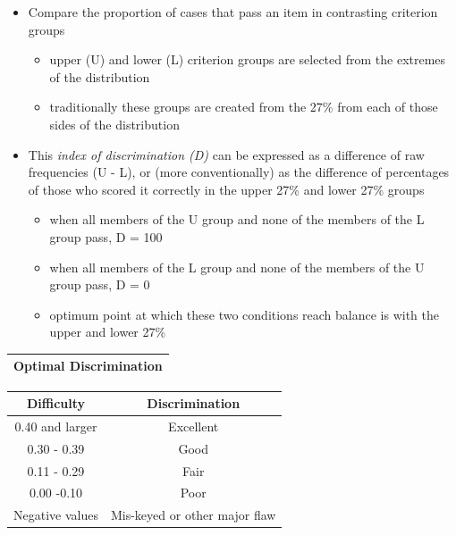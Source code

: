 \documentclass[
  english,
]{book}
\providecommand{\tightlist}{%
  \setlength{\itemsep}{0pt}\setlength{\parskip}{0pt}}
\begin{document}
\begin{itemize}
\tightlist
\item
  Compare the proportion of cases that pass an item in contrasting criterion groups

  \begin{itemize}
  \tightlist
  \item
    upper (U) and lower (L) criterion groups are selected from the extremes of the distribution
  \item
    traditionally these groups are created from the 27\% from each of those sides of the distribution
  \end{itemize}
\item
  This \emph{index of discrimination (D)} can be expressed as a difference of raw frequencies (U - L), or (more conventionally) as the difference of percentages of those who scored it correctly in the upper 27\% and lower 27\% groups

  \begin{itemize}
  \tightlist
  \item
    when all members of the U group and none of the members of the L group pass, D = 100
  \item
    when all members of the L group and none of the members of the U group pass, D = 0
  \item
    optimum point at which these two conditions reach balance is with the upper and lower 27\%
  \end{itemize}
\end{itemize}

\begin{longtable}[]{@{}l@{}}
\toprule
Optimal Discrimination \\
\midrule
\endhead
\bottomrule
\end{longtable}

\begin{longtable}[]{@{}cc@{}}
\toprule
Difficulty & Discrimination \\
\midrule
\endhead
0.40 and larger & Excellent \\
0.30 - 0.39 & Good \\
0.11 - 0.29 & Fair \\
0.00 -0.10 & Poor \\
Negative values & Mis-keyed or other major flaw \\
\bottomrule
\end{longtable}
\end{document}
